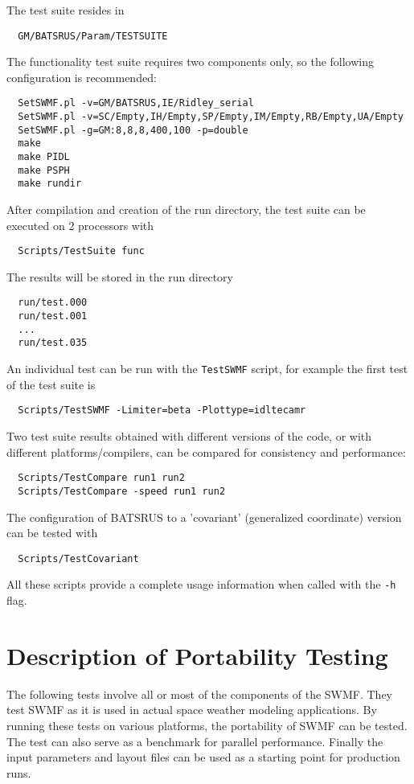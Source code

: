\documentclass[twoside,10pt]{article}
\begin{document}
The test suite resides in
\begin{verbatim}
  GM/BATSRUS/Param/TESTSUITE
\end{verbatim}
The functionality test suite requires two components only,
so the following configuration is recommended:
\begin{verbatim}
  SetSWMF.pl -v=GM/BATSRUS,IE/Ridley_serial
  SetSWMF.pl -v=SC/Empty,IH/Empty,SP/Empty,IM/Empty,RB/Empty,UA/Empty
  SetSWMF.pl -g=GM:8,8,8,400,100 -p=double
  make
  make PIDL
  make PSPH
  make rundir
\end{verbatim}
After compilation and creation of the run directory, the test suite
can be executed on 2 processors with
\begin{verbatim}
  Scripts/TestSuite func
\end{verbatim}
The results will be stored in the run directory
\begin{verbatim}
  run/test.000
  run/test.001
  ...
  run/test.035
\end{verbatim}
An individual test can be run with the {\tt TestSWMF} script,
for example the first test of the test suite is 
\begin{verbatim}
  Scripts/TestSWMF -Limiter=beta -Plottype=idltecamr
\end{verbatim}
Two test suite results obtained with different versions of the code,
or with different platforms/compilers, can be compared for 
consistency and performance:
\begin{verbatim}
  Scripts/TestCompare run1 run2
  Scripts/TestCompare -speed run1 run2
\end{verbatim}
The configuration of BATSRUS to a 'covariant' (generalized coordinate) version
can be tested with
\begin{verbatim}
  Scripts/TestCovariant
\end{verbatim}
All these scripts provide a complete usage information when called with the 
{\tt -h} flag.

\section{Description of Portability Testing \label{sec:portability}}

The following tests involve all or most of the components of the SWMF.
They test SWMF as it is used in actual space weather modeling applications.
By running these tests on various platforms, the portability of SWMF
can be tested. The test can also serve as a benchmark for parallel performance.
Finally the input parameters and layout files can be used as a starting
point for production runs.
\end{document}
